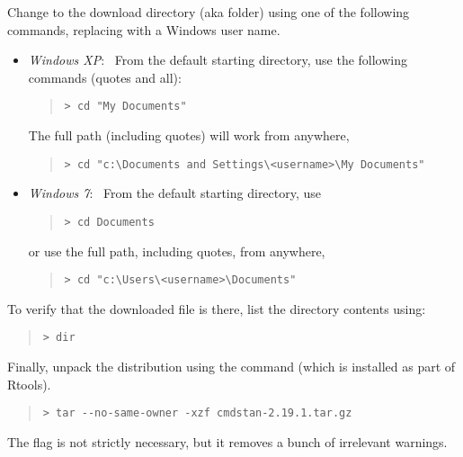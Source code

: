 Change to the download directory (aka folder) using one of the
following commands, replacing  with
a Windows user name.
%
\begin{itemize}
\item \emph{Windows XP}: \ From the default starting directory, use
the following commands (quotes and all):
\begin{quote}
\begin{Verbatim}[fontshape=sl,fontsize=\small]
> cd "My Documents"
\end{Verbatim}
\end{quote}
%
The full path (including quotes) will work from anywhere,
\begin{quote}
\begin{Verbatim}[fontshape=sl,fontsize=\small]
> cd "c:\Documents and Settings\<username>\My Documents"
\end{Verbatim}
\end{quote}
\item \emph{Windows 7}:  \  From the default starting directory, use
\begin{quote}
\begin{Verbatim}[fontshape=sl,fontsize=\small]
> cd Documents
\end{Verbatim}
\end{quote}
or use the full path, including quotes, from anywhere,
\begin{quote}
\begin{Verbatim}[fontshape=sl,fontsize=\small]
> cd "c:\Users\<username>\Documents"
\end{Verbatim}
\end{quote}
\end{itemize}
%
To verify that the downloaded \CmdStan {} file is there,
list the directory contents using:
%
\begin{quote}
\begin{Verbatim}[fontshape=sl,fontsize=\small]
> dir
\end{Verbatim}
\end{quote}

Finally, unpack the distribution using the  command (which
is installed as part of Rtools).
%
\begin{quote}
\begin{Verbatim}[fontshape=sl,fontsize=\small]
> tar --no-same-owner -xzf cmdstan-2.19.1.tar.gz
\end{Verbatim}
\end{quote}
%
The  flag is not strictly necessary,
but it removes a bunch of irrelevant warnings.


